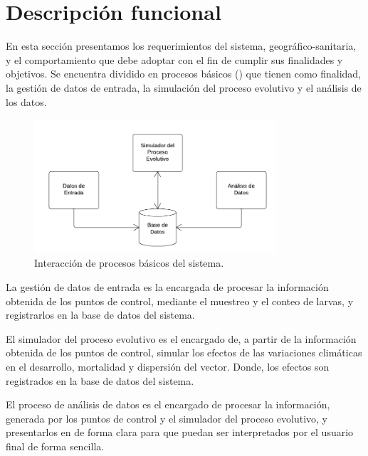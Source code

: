 \section{Descripción funcional}
En esta sección presentamos los requerimientos del sistema, geográfico-sanitaria, y el
comportamiento que debe adoptar con el fin de cumplir sus finalidades y objetivos. Se encuentra
dividido en procesos básicos () que tienen como finalidad,
la gestión de datos de entrada, la simulación del proceso evolutivo y el análisis de los datos.

\begin{figure}
\centering
\includegraphics[width=0.8\textwidth]{capitulo-5/graphics/interaccion-modulos.png}
\caption{\label{fig:cap-5-interaccion-procesos}Interacción de procesos básicos del sistema.}
\end{figure}

La gestión de datos de entrada es la encargada de procesar la información obtenida de los puntos
de control, mediante el muestreo y el conteo de larvas, y registrarlos en la base de datos del
sistema.

El simulador del proceso evolutivo es el encargado de, a partir de la información obtenida de los
puntos de control, simular los efectos de las variaciones climáticas en el desarrollo, mortalidad
y dispersión del vector. Donde, los efectos son registrados en la base de datos del sistema.

El proceso de análisis de datos es el encargado de procesar la información, generada por los
puntos de control y el simulador del proceso evolutivo, y presentarlos en de forma clara para que
puedan ser interpretados por el usuario final de forma sencilla.




